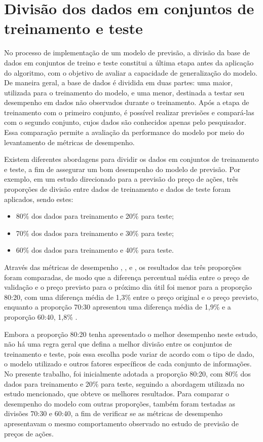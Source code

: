 \section{Divisão dos dados em conjuntos de treinamento e teste}

No processo de implementação de um modelo de previsão, a divisão da base de dados em conjuntos de treino e teste constitui a última etapa antes da aplicação do algoritmo, com o objetivo de avaliar a capacidade de generalização do modelo. De maneira geral, a base de dados é dividida em duas partes: uma maior, utilizada para o treinamento do modelo, e uma menor, destinada a testar seu desempenho em dados não observados durante o treinamento. Após a etapa de treinamento com o primeiro conjunto, é possível realizar previsões e compará-las com o segundo conjunto, cujos dados são conhecidos apenas pelo pesquisador. Essa comparação permite a avaliação da performance do modelo por meio do levantamento de métricas de desempenho.

Existem diferentes abordagens para dividir os dados em conjuntos de treinamento e teste, a fim de assegurar um bom desempenho do modelo de previsão. Por exemplo, em um estudo direcionado para a previsão do preço de ações, três proporções de divisão entre dados de treinamento e dados de teste foram aplicados, sendo estes:

\begin{itemize}
	\item 80\% dos dados para treinamento e 20\% para teste;
	\item 70\% dos dados para treinamento e 30\% para teste;
	\item 60\% dos dados para treinamento e 40\% para teste.
\end{itemize}

Através das métricas de desempenho , ,  e , os resultados das três proporções foram comparadas, de modo que a diferença percentual média entre o preço de validação e o preço previsto para o próximo dia útil foi menor para a proporção 80:20, com uma diferença média de 1,3\% entre o preço original e o preço previsto, enquanto a proporção 70:30 apresentou uma diferença média de 1,9\% e a proporção 60:40, 1,8\% \cite{supri2023asian}.

Embora a proporção 80:20 tenha apresentado o melhor desempenho neste estudo, não há uma regra geral que defina a melhor divisão entre os conjuntos de treinamento e teste, pois essa escolha pode variar de acordo com o tipo de dado, o modelo utilizado e outros fatores específicos de cada conjunto de informações. No presente trabalho, foi inicialmente adotada a proporção 80:20, com 80\% dos dados para treinamento e 20\% para teste, seguindo a abordagem utilizada no estudo mencionado, que obteve os melhores resultados. Para comparar o desempenho do modelo com outras proporções, também foram testadas as divisões 70:30 e 60:40, a fim de verificar se as métricas de desempenho apresentavam o mesmo comportamento observado no estudo de previsão de preços de ações.


